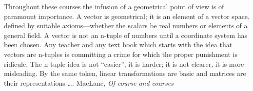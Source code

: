 \documentclass[11pt,openany]{book}
\begin{document}
\begin{boxquote}
Throughout these courses the infusion of a geometrical
point of view is of paramount importance. A vector
is geometrical; it is an element of a vector space, defined
by suitable axioms—whether the scalars be real numbers or
elements of a general field. A vector is not an n-tuple of
numbers until a coordinate system has been chosen. Any
teacher and any text book which starts with the idea that vectors
are n-tuples is committing a crime for which the proper
punishment is ridicule. The n-tuple idea is not ``easier'', it is
harder; it is not clearer, it is more misleading. By the same
token, linear transformations are basic and matrices are their
representations {\ldots}.
\tcblower
{MacLane, \textit{Of course and courses}~\cite{maclane1954}}
\end{boxquote}
\end{document}

